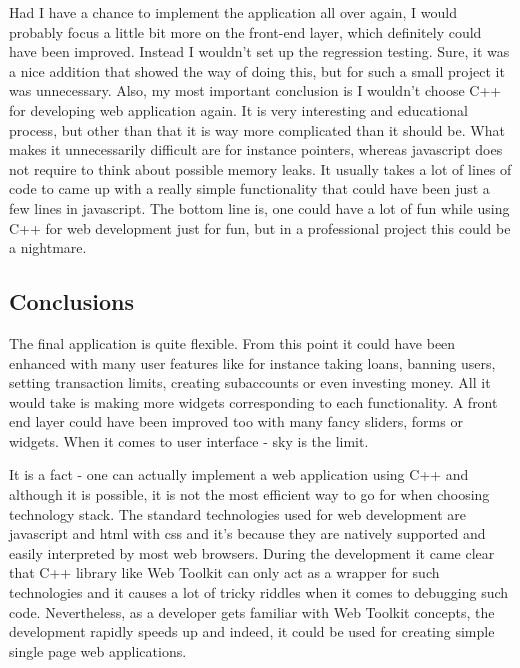 \documentclass[a4paper,12pt]{book}
\begin{document}
{\bigskip
Had I have a chance to implement the application all over again, I would probably focus a little bit more on the front-end layer, which definitely could have been improved. Instead I wouldn't set up the regression testing. Sure, it was a nice addition that showed the way of doing this, but for such a small project it was unnecessary. Also, my most important conclusion is I wouldn't choose C++ for developing web application again. It is very interesting and educational process, but other than that it is way more complicated than it should be. What makes it unnecessarily difficult are for instance pointers, whereas javascript does not require to think about possible memory leaks. It usually takes a lot of lines of code to came up with a really simple functionality that could have been just a few lines in javascript. The bottom line is, one could have a lot of fun while using C++ for web development just for fun, but in a professional project this could be a nightmare.

\subsection*{Conclusions}
{
\bigskip
The final application is quite flexible. From this point it could have been enhanced with many user features like for instance taking loans, banning users, setting transaction limits, creating subaccounts or even investing money. All it would take is making more widgets corresponding to each functionality. A front end layer could have been improved too with many fancy sliders, forms or widgets. When it comes to user interface - sky is the limit.

\bigskip
It is a fact - one can actually implement a web application using C++ and although it is possible, it is not the most efficient way to go for when choosing technology stack. The standard technologies used for web development are javascript and html with css and it's because they are natively supported and easily interpreted by most web browsers. During the development it came clear that C++ library like Web Toolkit can only act as a wrapper for such technologies and it causes a lot of tricky riddles when it comes to debugging such code. Nevertheless, as a developer gets familiar with Web Toolkit concepts, the development rapidly speeds up and indeed, it could be used for creating simple single page web applications.
}

}
\end{document}
